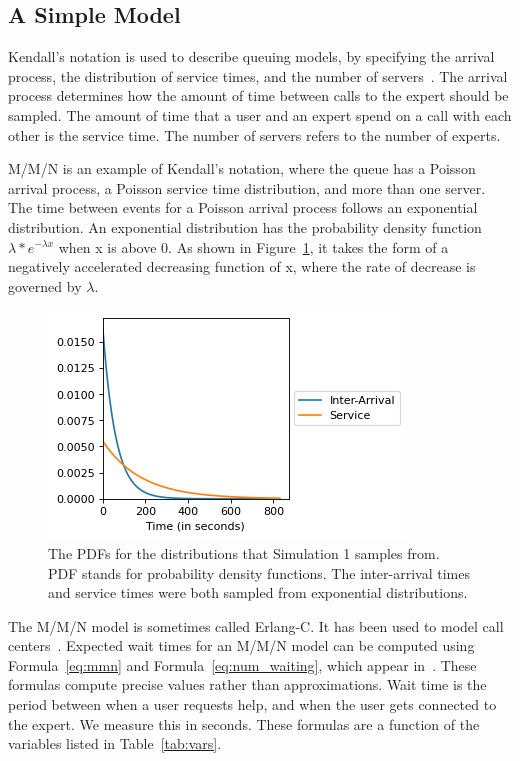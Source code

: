 \subsection{A Simple Model}\label{sec:simple}

Kendall's notation is used to describe queuing models, by specifying the arrival
process, the distribution of service times, and the number of
servers~\cite{kendall}.
The arrival process determines how the amount of time between calls to the
expert should be sampled.
The amount of time that a user and an expert spend on a call with each other is
the service time.
The number of servers refers to the number of experts.

M/M/N is an example of Kendall's notation, where the queue has a Poisson arrival
process, a Poisson service time distribution, and more than one server.
The time between events for a Poisson arrival process follows an exponential
distribution.
An exponential distribution has the probability density function
$\lambda * e ^ {- \lambda x}$ when x is above 0.
As shown in Figure~\ref{fig:simple_sim1_dists}, it takes the form of a
negatively accelerated decreasing function of x, where the rate of decrease is
governed by $\lambda$.

\begin{figure}[h]
  \includegraphics{figures/montecarlo/expon_expon.png}
  \caption[The PDFs for the distributions that Simulation 1 samples from]{
    The PDFs for the distributions that Simulation 1 samples from.
    PDF stands for probability density functions.
    The inter-arrival times and service times were both sampled from
    exponential distributions.
  }\label{fig:simple_sim1_dists}
\end{figure}

The M/M/N model is sometimes called Erlang-C.
It has been used to model call centers~\cite{queue1}.
Expected wait times for an M/M/N model can be computed using
Formula~\ref{eq:mmn} and Formula~\ref{eq:num_waiting}, which appear
in~\cite{mmn_formula}.
These formulas compute precise values rather than approximations.
Wait time is the period between when a user requests help, and when the user
gets connected to the expert.
We measure this in seconds.
These formulas are a function of the variables listed in Table~\ref{tab:vars}.

